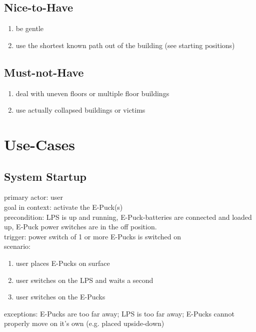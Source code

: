 \documentclass[a4paper,parskip,headheight=38pt]{scrartcl} %
\begin{document}
\subsection{Nice-to-Have}
\begin{enumerate}[label=\nicetohave]
\item be gentle
\item use the shortest known path out of the building (see starting positions)
\end{enumerate}

\subsection{Must-not-Have}
\begin{enumerate}[label=\mustnothave]
\item deal with uneven floors or multiple floor buildings
\item use actually collapsed buildings or victims
\end{enumerate}


\section{Use-Cases}
\subsection{System Startup}
primary actor: user \\
goal in context: activate the E-Puck(s) \\
precondition: LPS is up and running, E-Puck-batteries are connected and loaded up, E-Puck power switches are in the off position. \\
trigger: power switch of 1 or more E-Pucks is switched on \\
scenario: 
\begin{enumerate}[label={\arabic*.}]
	\item user places E-Pucks on surface 
	\item user switches on the LPS and waits a second 
	\item user switches on the E-Pucks 
\end{enumerate}
exceptions: E-Pucks are too far away; LPS is too far away; E-Pucks cannot properly move on it's own (e.g. placed upside-down) \\
\end{document}
